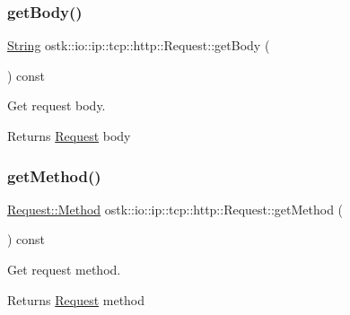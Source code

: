 \subsubsection{\texorpdfstring{get\+Body()}{getBody()}}
{\footnotesize\ttfamily \hyperlink{namespaceostk_1_1io_1_1ip_1_1tcp_1_1http_a88a1b82fb01d02df64ca01ef4058bbef}{String} ostk\+::io\+::ip\+::tcp\+::http\+::\+Request\+::get\+Body (\begin{DoxyParamCaption}{ }\end{DoxyParamCaption}) const}



Get request body. 

\begin{DoxyReturn}{Returns}
\hyperlink{classostk_1_1io_1_1ip_1_1tcp_1_1http_1_1_request}{Request} body 
\end{DoxyReturn}
\mbox{\label{classostk_1_1io_1_1ip_1_1tcp_1_1http_1_1_request_a8c31b842f3672488b2fb42a304873a94}} 
\subsubsection{\texorpdfstring{get\+Method()}{getMethod()}}
{\footnotesize\ttfamily \hyperlink{classostk_1_1io_1_1ip_1_1tcp_1_1http_1_1_request_a07a40d81f4a6fb8443c80afc11571dd3}{Request\+::\+Method} ostk\+::io\+::ip\+::tcp\+::http\+::\+Request\+::get\+Method (\begin{DoxyParamCaption}{ }\end{DoxyParamCaption}) const}



Get request method. 

\begin{DoxyReturn}{Returns}
\hyperlink{classostk_1_1io_1_1ip_1_1tcp_1_1http_1_1_request}{Request} method 
\end{DoxyReturn}
\mbox{\label{classostk_1_1io_1_1ip_1_1tcp_1_1http_1_1_request_a75e34ca54feb62159075147444ffa6ec}} 

